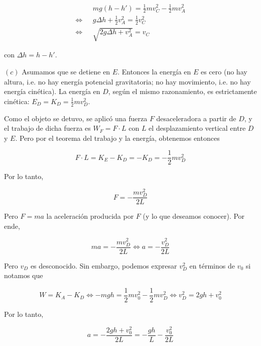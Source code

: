 \documentclass[12pt]{article}
\theoremstyle{definition}
\begin{document}
\begin{align*}
    &mg(h-h') = \frac{1}{2}mv_C^2 - \frac{1}{2}mv_A^2 \\ 
    \iff ~ ~ ~ 
    &g\Delta h + \frac{1}{2}v_A^2 = \frac{1}{2}v_C^2 \\ 
    \iff ~ ~ ~ 
    &\sqrt{2g\Delta h + v^2_A}  = v_C
\end{align*}

con $\Delta h = h - h'$.

$(c)$ Asumamos que se detiene en $E$. Entonces la energía en $E$ es cero (no hay
altura, i.e. no hay energía potencial gravitatoria; no hay movimiento, i.e. no
hay energía cinética). La energía en $D$, según el mismo razonamiento, es
estrictamente cinética: $E_D = K_D = \frac{1}{2}mv_D^2$.

Como el objeto se detuvo, se aplicó una fuerza $F$ desaceleradora a partir de
$D$, y el trabajo de dicha fuerza es $W_F = F \cdot L$ con $L$ el desplazamiento
vertical entre $D$ y $E$. Pero por el teorema del trabajo y la energía,
obtenemos entonces

\begin{equation*}
    F \cdot L = K_E - K_D = -K_D = -\frac{1}{2}m v_D^2
\end{equation*}

Por lo tanto, 

\begin{equation*}
    F = -\frac{mv_D^2}{2L}
\end{equation*}

Pero $F = ma$ la aceleración producida por $F$ (y lo que deseamos conocer). Por
ende, 

\begin{equation*}
    ma = -\frac{mv^2_D}{2L} \iff a = -\frac{v_D^2}{2L}
\end{equation*}

Pero $v_D$ es desconocido. Sin embargo, podemos expresar $v_D^2$ en términos de
$v_0$ si notamos que 

\begin{equation*}
    W = K_A - K_D \iff -mgh = \frac{1}{2}mv_0^2 - \frac{1}{2}mv_D^2 \iff v_D^2 =
    2gh + v_0^2
\end{equation*}

Por lo tanto, 

\begin{equation*}
    a = -\frac{2gh + v_0^2}{2L} = -\frac{gh}{L} - \frac{v_0^2}{2L}
\end{equation*}

\pagebreak 
\end{document}
